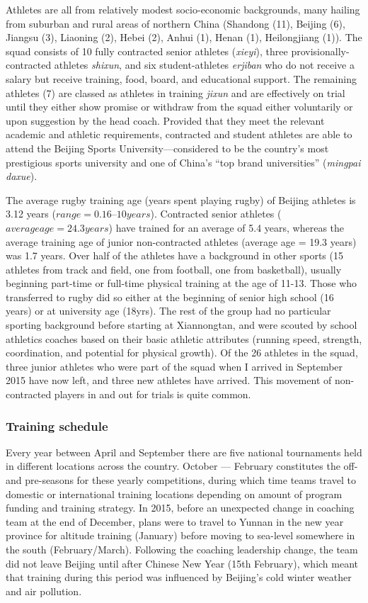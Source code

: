 Athletes are all from relatively modest socio-economic backgrounds, many hailing from suburban and rural areas of northern China (Shandong (11), Beijing (6), Jiangsu (3), Liaoning (2), Hebei (2), Anhui (1), Henan (1), Heilongjiang (1)).  The squad consists of 10 fully contracted senior athletes (\textit{xieyi}), three provisionally-contracted athletes \textit{shixun}, and six student-athletes \textit{erjiban} who do not receive a salary but receive training, food, board, and educational support.  The remaining athletes (7) are classed as athletes in training \textit{jixun} and are effectively on trial until they either show promise or withdraw from the squad either voluntarily or upon suggestion by the head coach.  Provided that they meet the relevant academic and athletic requirements, contracted and student athletes are able to attend the Beijing Sports University—considered to be the country's most prestigious sports university and one of China's ``top brand universities'' (\textit{mingpai daxue}).

The average rugby training age (years spent playing rugby) of Beijing athletes is 3.12 years ($range = 0.16 – 10 years$).  Contracted senior athletes ($average age = 24.3 years$) have trained for an average of 5.4 years, whereas the average training age of junior non-contracted athletes (average age = 19.3 years) was 1.7 years.  Over half of the athletes have a background in other sports (15 athletes from track and field, one from football, one from basketball), usually beginning part-time or full-time physical training at the age of 11-13.  Those who transferred to rugby did so either at the beginning of senior high school (16 years) or at university age (18yrs).  The rest of the group had no particular sporting background before starting at Xiannongtan, and were scouted by school athletics coaches based on their basic athletic attributes (running speed, strength, coordination, and potential for physical growth).  Of the 26 athletes in the squad, three junior athletes who were part of the squad when I arrived in September 2015 have now left, and three new athletes have arrived. This movement of non-contracted players in and out for trials is quite common.

\subsubsection{Training schedule}
Every year between April and September there are five national tournaments held in different locations across the country.  October –-- February constitutes the off- and pre-seasons for these yearly competitions, during which time teams travel to domestic or international training locations depending on amount of program funding and training strategy.  In 2015, before an unexpected change in coaching team at the end of December, plans were to travel to Yunnan in the new year province for altitude training (January) before moving to sea-level somewhere in the south (February/March).  Following the coaching leadership change, the team did not leave Beijing until after Chinese New Year (15th February), which meant that training during this period was influenced by Beijing's cold winter weather and air pollution.

